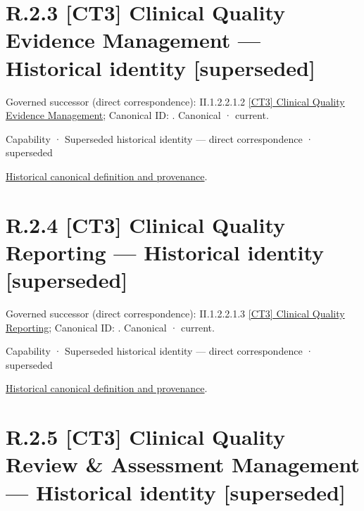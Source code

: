 \section*{R.2.3 [CT3] Clinical Quality Evidence Management — Historical identity [superseded]}
\label{navigation:R.2.3}

{\small Governed successor (direct correspondence): II.1.2.2.1.2 \hyperref[element:1b0a1c6945ed4fadba045ff4753c104c]{[CT3] Clinical Quality Evidence Management}; Canonical ID: \texttt{}. Canonical · current.}\par
\label{element:f31902d474894670aeef3e0abbedccf0}
{\small Capability · Superseded historical identity — direct correspondence · superseded}\par
\href{../../../../continuum/strategy/capability/f31902d474894670aeef3e0abbedccf0.md}{Historical canonical definition and provenance}.\par
\section*{R.2.4 [CT3] Clinical Quality Reporting — Historical identity [superseded]}
\label{navigation:R.2.4}

{\small Governed successor (direct correspondence): II.1.2.2.1.3 \hyperref[element:70f34839c23042d59469e6ef96944057]{[CT3] Clinical Quality Reporting}; Canonical ID: \texttt{}. Canonical · current.}\par
\label{element:e5812fcdf3f5465b9b1d8ba536075c5f}
{\small Capability · Superseded historical identity — direct correspondence · superseded}\par
\href{../../../../continuum/strategy/capability/e5812fcdf3f5465b9b1d8ba536075c5f.md}{Historical canonical definition and provenance}.\par
\section*{R.2.5 [CT3] Clinical Quality Review \& Assessment Management — Historical identity [superseded]}
\label{navigation:R.2.5}

